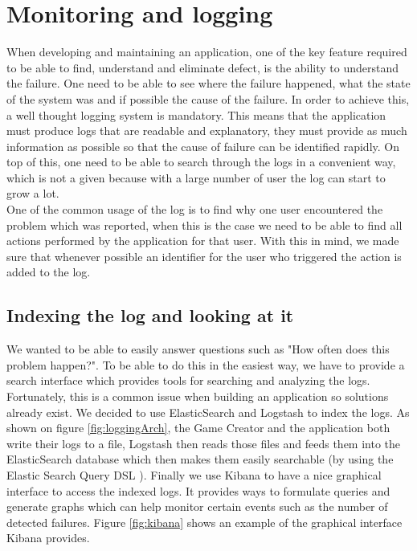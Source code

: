 \section{Monitoring and logging}\label{sec:logging}
When developing and maintaining an application, one of the key feature required to be able to find, understand and eliminate defect, is the ability to understand the failure. One need to be able to see where the failure happened, what the state of the system was and if possible the cause of the failure. In order to achieve this, a well thought logging system is mandatory. This means that the application must produce logs that are readable and explanatory, they must provide as much information as possible so that the cause of failure can be identified rapidly. On top of this, one need to be able to search through the logs in a convenient way, which is not a given because with a large number of user the log can start to grow a lot.\\
One of the common usage of the log is to find why one user encountered the problem which was reported, when this is the case we need to be able to find all actions performed by the application for that user. With this in mind, we made sure that whenever possible an identifier for the user who triggered the action is added to the log.
\subsection{Indexing the log and looking at it}
We wanted to be able to easily answer questions such as "How often does this problem happen?". To be able to do this in the easiest way, we have to provide a search interface which provides tools for searching and analyzing the logs. Fortunately, this is a common issue when building an application so solutions already exist. We decided to use ElasticSearch\cite{elasticsearch} and Logstash\cite{logstash} to index the logs. As shown on figure \ref{fig:loggingArch}, the Game Creator and the application both write their logs to a file, Logstash then reads those files and feeds them into the ElasticSearch database which then makes them easily searchable (by using the Elastic Search Query DSL \cite{querydsl}). Finally we use Kibana\cite{kibana} to have a nice graphical interface to access the indexed logs. It provides ways to formulate queries and generate graphs which can help monitor certain events such as the number of detected failures. Figure \ref{fig:kibana} shows an example of the graphical interface Kibana provides.
